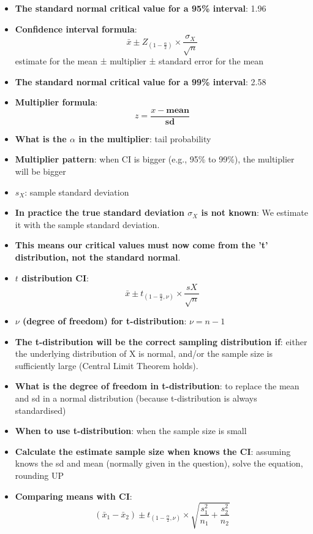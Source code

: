 \documentclass[12pt]{book}
\begin{document}
\newpage

\pagestyle{fancy}

\begin{itemize}
\item \textbf{The standard normal critical value for a 95\% interval}: 1.96
\item \textbf{Confidence interval formula}: $$\bar{x} \pm Z_{(1-\frac{\alpha}{2})} \times \frac{\sigma_X}{\sqrt{n}}$$
estimate for the mean ± multiplier ± standard error for the mean
\item \textbf{The standard normal critical value for a 99\% interval}: 2.58
\item \textbf{Multiplier formula}: $$z = \frac{x - \textbf{mean}}{\textbf{sd}}$$
\item \textbf{What is the $\alpha$ in the multiplier}: tail probability
\item \textbf{Multiplier pattern}: when CI is bigger (e.g., 95\% to 99\%), the multiplier will be bigger
\item \textbf{$s_X$}: sample standard deviation
\item \textbf{In practice the true standard deviation $\sigma_X$ is not known}: We estimate it with the sample standard deviation.
\item \textbf{This means our critical values must now come from the 't' distribution, not the standard normal}.
\item \textbf{$t$ distribution CI}: $$\bar{x} \pm t_{(1-\frac{\alpha}{2}, \nu)} \times \frac{sX}{\sqrt{n}}$$
\item \textbf{$\nu$ (degree of freedom) for t-distribution}: $\nu = n - 1$
\item \textbf{The t-distribution will be the correct sampling distribution if}: either the underlying distribution of X is normal, and/or the sample size is sufficiently large (Central Limit Theorem holds).
\item \textbf{What is the degree of freedom in t-distribution}: to replace the mean and sd in a normal distribution (because t-distribution is always standardised)
\item \textbf{When to use t-distribution}: when the sample size is small
\item \textbf{Calculate the estimate sample size when knows the CI}: assuming knows the sd and mean (normally given in the question), solve the equation, rounding UP
\item \textbf{Comparing means with CI}: $$(\bar{x}_1 - \bar{x}_2) \pm t_{(1-\frac{\alpha}{2}, \nu)} \times \sqrt{\frac{s_1^2}{n_1} + \frac{s_2^2}{n_2}}$$

\end{itemize}
\end{document}
